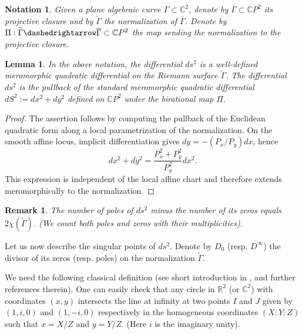 \documentclass[reqno]{amsart}
\newtheorem{lemma}[theorem]{Lemma}
\newtheorem{remark}{Remark}
\newtheorem{notation}{Notation}
\newcommand{\bR}{\mathbb{R}}
\newcommand{\bC}{\mathbb{C}}
\newcommand {\Ga}{\Gamma}
\theoremstyle{definition}
\theoremstyle{remark}
\theoremstyle{definition}
\theoremstyle{definition}
\theoremstyle{definition}
\begin{document}
  \begin{notation}
 Given a plane algebraic curve $\Ga \subset \bC^2$, denote by $\overline \Ga \subset \bC P^2$ its projective closure and by $\widetilde \Ga$ the normalization of $\overline \Ga$. Denote by $\Pi: \widetilde \Ga \dashedrightarrow \overline\Ga\subset \bC P^2$ the map sending the normalization to the projective closure.
  \end{notation}

\begin{lemma}\label{lm:basic}  In the above notation, the differential $ds^2$ is a well-defined meromorphic quadratic differential on the Riemann surface $\widetilde \Ga$.   The differential  $ds^2$  is the pullback of the standard meromorphic quadratic differential $dS^2:=dx^2+dy^2$  defined on $\bC P^2$ under the birational map $\Pi$.
\end{lemma}
\begin{proof}
The assertion follows by computing the pullback of the Euclidean quadratic form along a local parametrization of the normalization. On the smooth affine locus, implicit differentiation gives $dy=-(P_x/P_y)dx$, hence
\[
 dx^2+dy^2=\frac{P_x^2+P_y^2}{P_y^2}dx^2.
\]
This expression is independent of the local affine chart and therefore extends meromorphically to the normalization.
\end{proof}

\begin{remark} The number of  poles of $ds^2$ minus the number of its zeros equals $2 \chi(\widetilde\Ga)$. (We count both poles and zeros with their multiplicities).
\end{remark}

Let us now describe the singular points of  $ds^2$.
Denote by $D_0$ (resp. $D^\infty$)  the divisor of its zeros (resp. poles) on the normalization $\widetilde \Ga$.

\medskip
We need the following classical definition (see short introduction in \cite{PiSh}, \cite{Ri} and further references therein). One can easily check  that any circle in $\bR^2$ (or $\bC^2$) with coordinates $(x,y)$ intersects the  line at infinity at  two points $I$ and $J$ given by $(1,i,0)$ and $(1,-i,0)$ respectively in the homogeneous coordinates $(X:Y:Z)$ such that $x=X/Z$ and $y=Y/Z$.  (Here $i$ is the imaginary unity).
\end{document}
